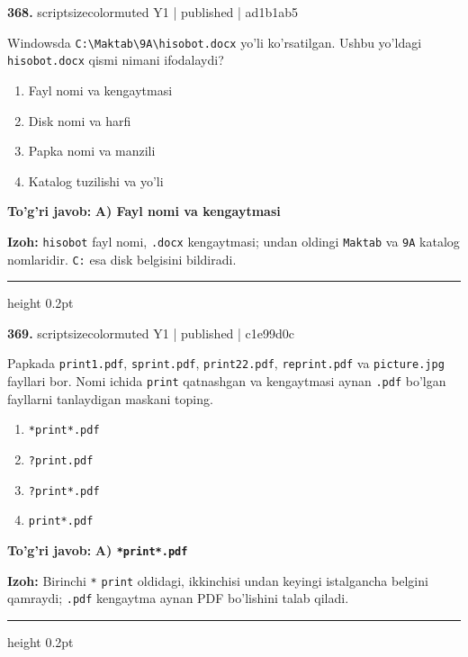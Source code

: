 \documentclass[10pt,a4paper]{article}
\begin{document}
{\bfseries\sffamily\color{ink} 368.} {scriptsizecolor{muted} Y1 | published | ad1b1ab5}
\par
Windowsda \texttt{C:\textbackslash{}Maktab\textbackslash{}9A\textbackslash{}hisobot.docx} yo'li ko'rsatilgan. Ushbu yo'ldagi \texttt{hisobot.docx} qismi nimani ifodalaydi?
\begin{enumerate}[label=\Alph*),leftmargin=9mm]
\item Fayl nomi va kengaytmasi
\item Disk nomi va harfi
\item Papka nomi va manzili
\item Katalog tuzilishi va yo'li
\end{enumerate}
\begin{tcolorbox}[enhanced,breakable,colback=teal!4,colframe=teal!60!black,boxrule=0.45pt,arc=1.2mm,left=2.7mm,right=2.7mm,top=1.8mm,bottom=1.8mm,before skip=2mm,after skip=2mm]
{\bfseries\sffamily\color{teal}To'g'ri javob:} \textbf{A) Fayl nomi va kengaytmasi}
\par\smallskip
{\bfseries Izoh:} \texttt{hisobot} fayl nomi, \texttt{.docx} kengaytmasi; undan oldingi \texttt{Maktab} va \texttt{9A} katalog nomlaridir. \texttt{C:} esa disk belgisini bildiradi.
\end{tcolorbox}
\vspace{2mm}\hrule height 0.2pt\vspace{3mm}

{\bfseries\sffamily\color{ink} 369.} {scriptsizecolor{muted} Y1 | published | c1e99d0c}
\par
Papkada \texttt{print1.pdf}, \texttt{sprint.pdf}, \texttt{print22.pdf}, \texttt{reprint.pdf} va \texttt{picture.jpg} fayllari bor. Nomi ichida \texttt{print} qatnashgan va kengaytmasi aynan \texttt{.pdf} bo'lgan fayllarni tanlaydigan maskani toping.
\begin{enumerate}[label=\Alph*),leftmargin=9mm]
\item \texttt{*print*.pdf}
\item \texttt{?print.pdf}
\item \texttt{?print*.pdf}
\item \texttt{print*.pdf}
\end{enumerate}
\begin{tcolorbox}[enhanced,breakable,colback=teal!4,colframe=teal!60!black,boxrule=0.45pt,arc=1.2mm,left=2.7mm,right=2.7mm,top=1.8mm,bottom=1.8mm,before skip=2mm,after skip=2mm]
{\bfseries\sffamily\color{teal}To'g'ri javob:} \textbf{A) \texttt{*print*.pdf}}
\par\smallskip
{\bfseries Izoh:} Birinchi \texttt{*} \texttt{print} oldidagi, ikkinchisi undan keyingi istalgancha belgini qamraydi; \texttt{.pdf} kengaytma aynan PDF bo'lishini talab qiladi.
\end{tcolorbox}
\vspace{2mm}\hrule height 0.2pt\vspace{3mm}
\end{document}
